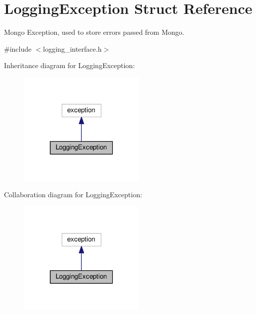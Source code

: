 \hypertarget{structLoggingException}{}\section{Logging\+Exception Struct Reference}
\label{structLoggingException}


Mongo Exception, used to store errors passed from Mongo.  




{\ttfamily \#include $<$logging\+\_\+interface.\+h$>$}



Inheritance diagram for Logging\+Exception\+:\nopagebreak
\begin{figure}[H]
\begin{center}
\leavevmode
\includegraphics[width=174pt]{structLoggingException__inherit__graph}
\end{center}
\end{figure}


Collaboration diagram for Logging\+Exception\+:\nopagebreak
\begin{figure}[H]
\begin{center}
\leavevmode
\includegraphics[width=174pt]{structLoggingException__coll__graph}
\end{center}
\end{figure}
